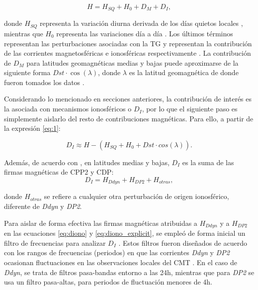 \begin{equation}
    \label{eq:1}
        H = H_{SQ} + H_0 + D_{M} + D_{I},
\end{equation}

donde $H_{SQ}$ representa la variación diurna derivada de los días quietos locales \cite{vanKampt}, mientras que $H_0$ representa las variaciones día a día \parencite{baseline_Gjerloev}. Los últimos términos representan las perturbaciones asociadas con la TG y representan la contribución de las corrientes magnetosféricas e ionosféricas respectivamente \parencite{ddyn2005, angeoddyn}. La contribución de $D_M$ para latitudes geomagnéticas medias y bajas puede aproximarse de la siguiente forma $Dst \cdot \cos(\lambda)$, donde $\lambda$ es la latitud geomagnética de donde fueron tomados los datos \parencite{amorymazaudier_2017}. 
\vspace{1 em}

Considerando lo mencionado en secciones anteriores, la contribución de interés es la asociada con mecanismos ionosféricos o $D_I$, por lo que el siguiente paso es simplemente aislarlo del resto de contribuciones magnéticas. Para ello, a partir de la expresión \ref{eq:1}:

\begin{equation}
\label{eq:diono}
   D_{I} \approx H -(H_{SQ} +  H_0 + Dst \cdot cos(\lambda)).
\end{equation}

Además, de acuerdo con \cite{ddyn2005, angeoddyn}, en latitudes medias y bajas, $D_I$ es la suma de las firmas magnéticas de CPP2 y CDP:
\begin{equation}
\label{eq:diono_explicit}
   D_{I} = H_{Ddyn} + H_{DP2} + H_{otras},
\end{equation}

donde $H_{otras}$ se refiere a cualquier otra perturbación de origen ionosférico, diferente de \emph{Ddyn} y \emph{DP2}.
\vspace{1 em}

Para aislar de forma efectiva las firmas magnéticas atribuidas a $H_{Ddyn}$ y a $H_{DP2}$ en las ecuaciones \ref{eq:diono} y \ref{eq:diono_explicit}, se empleó de forma inicial un filtro de frecuencias para analizar $D_I$ \parencite{amory2020_filtros}. Estos filtros fueron diseñados de acuerdo con los rangos de frecuencias (periodos) en que las corrientes \emph{Ddyn} y \emph{DP2} ocasionan fluctuaciones en las observaciones locales del CMT \parencite{nishida_68_fluctuations, blanc_ddyn, ddyn_diag2}. En el caso de \emph{Ddyn}, se trata de filtros pasa-bandas entorno a las 24h, mientras que para \emph{DP2} se usa un filtro pasa-altas, para periodos de fluctuación menores de 4h. 

